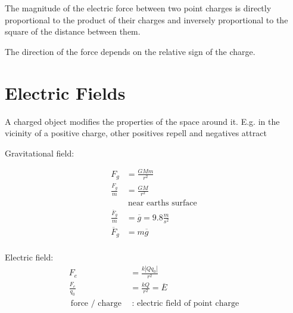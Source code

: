 The magnitude of the electric force between two point charges is directly proportional to the product of their
charges and inversely proportional to the square of the distance between them.


The direction of the force depends on the relative sign of the charge.



\begin{example}

\end{example}


\section{Electric Fields}%
\label{sec:electric_fields}

A charged object modifies the properties of the space around it. E.g. in the vicinity of a positive charge, other positives repell and negatives attract

Gravitational field:

\begin{align*}
	F_{g} &= \frac{G Mm}{r^2}\\
	\frac{F_{g}}{m} &= \frac{GM}{r^2} \\
					&	\:\text{near earths surface}\:\\
	\frac{\overline{F}_{g}}{m} &=  \overline{g} = 9.8 \frac{m}{s^2} \\
	\overline{F}_{g}&= m\overline{g} \\
\end{align*}

Electric field:
\begin{align*}
	F_{e} &= \frac{k\left| Qq_{0} \right| }{r^2} \\
	\frac{F_{e}}{q_{0}} &= \frac{kQ}{r^2} = \overline{E} \\
	\:\text{force / charge}\: & \:\text{: electric field of point charge}\:
\end{align*}


